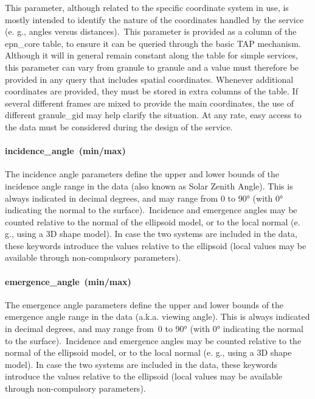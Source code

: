 \documentclass[11pt,a4paper]{ivoa}
\begin{document}
This parameter, although related to the specific coordinate system in use, is mostly intended to identify the nature of the coordinates handled by the service (e. g., angles versus distances). This parameter is provided as a column of the epn\_core table, to ensure it can be queried through the basic TAP mechanism. Although it will in general remain constant along the table for simple services, this parameter can vary from granule to granule and a value must therefore be provided in any query that includes spatial coordinates. Whenever additional coordinates are provided, they must be stored in extra columns of the table. If several different frames are mixed to provide the main coordinates, the use of different granule\_gid may help clarify the situation. At any rate, easy access to the data must be considered during the design of the service. 

\paragraph{incidence\_angle (min/max)}

The incidence angle parameters define the upper and lower bounds of the incidence angle range in the data (also known as Solar Zenith Angle). This is always indicated in decimal degrees, and may range from 0 to 90° (with 0° indicating the normal to the surface). Incidence and emergence angles may be counted relative to the normal of the ellipsoid model, or to the local normal (e. g., using a 3D shape model). In case the two systems are included in the data, these keywords introduce the values relative to the ellipsoid (local values may be available through non-compulsory parameters).

\paragraph{emergence\_angle (min/max)}

The emergence angle parameters define the upper and lower bounds of the emergence angle range in the data (a.k.a. viewing angle). This is always indicated in decimal degrees, and may range from 0 to 90° (with 0° indicating the normal to the surface). Incidence and emergence angles may be counted relative to the normal of the ellipsoid model, or to the local normal (e. g., using a 3D shape model). In case the two systems are included in the data, these keywords introduce the values relative to the ellipsoid (local values may be available through non-compulsory parameters).
\end{document}
